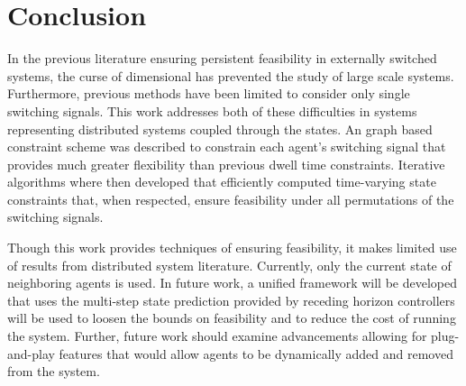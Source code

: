 \section{Conclusion}
In the previous literature ensuring persistent feasibility in externally switched systems, the curse of dimensional has prevented the study of large scale systems. Furthermore, previous methods have been limited to consider only single switching signals. This work addresses both of these difficulties in systems representing distributed systems coupled through the states. An graph based constraint scheme was described to constrain each agent's switching signal that provides much greater flexibility than previous dwell time constraints. Iterative algorithms where then developed that efficiently computed time-varying state constraints that, when respected, ensure feasibility under all permutations of the switching signals. 

Though this work provides techniques of ensuring feasibility, it makes limited use of results from distributed system literature. Currently, only the current state of neighboring agents is used. In future work, a unified framework will be developed that uses the multi-step state prediction provided by receding horizon controllers will be used to loosen the bounds on feasibility and to reduce the cost of running the system. Further, future work should examine advancements allowing for plug-and-play features that would allow agents to be dynamically added and removed from the system. 